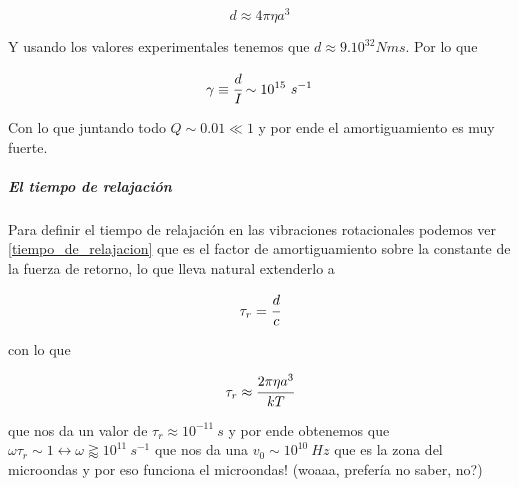 \documentclass[a4paper,spanish]{article}
\numberwithin{equation}{section}
\begin{document}
\begin{equation}
d \approx 4 \pi \eta a^3
\end{equation}

Y usando los valores experimentales tenemos que $d\approx 9.10^{32} N m s$. Por lo que

\[\gamma \equiv \cfrac{d}{I} \sim 10^{15} \ s^{-1}\]

Con lo que juntando todo $Q \sim 0.01 \ll 1$ y por ende el amortiguamiento es muy fuerte.

\subparagraph*{El tiempo de relajaci\'on}
Para definir el tiempo de relajaci\'on en las vibraciones rotacionales podemos ver \ref{tiempo_de_relajacion} que es el factor de amortiguamiento sobre la constante de la fuerza de retorno, lo que lleva natural extenderlo a 

\[\tau_r = \cfrac{d}{c}\]

con lo que

\[\tau_r \approx \cfrac{2\pi\eta a^3}{kT}\]

que nos da un valor de $\tau_r \approx 10^{-11} \ s$ y por ende obtenemos que $\omega\tau_r \sim 1 \leftrightarrow \omega \gtrapprox 10^{11} \ s^{-1}$ que nos da una $v_0 \sim 10^{10} \ Hz$ que es la zona del microondas y por eso funciona el microondas! (woaaa, prefer\'ia no saber, no?)
\end{document}
